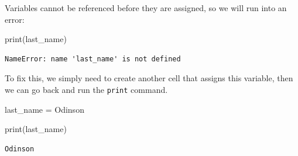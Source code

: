 \documentclass[
  letterpaper,
  DIV=11,
  numbers=noendperiod]{scrreprt}
\newenvironment{Shaded}{\begin{snugshade}}{\end{snugshade}}
\newcommand{\BuiltInTok}[1]{\textcolor[rgb]{0.00,0.23,0.31}{#1}}
\newcommand{\NormalTok}[1]{\textcolor[rgb]{0.00,0.23,0.31}{#1}}
\newcommand{\OperatorTok}[1]{\textcolor[rgb]{0.37,0.37,0.37}{#1}}
\newcommand{\StringTok}[1]{\textcolor[rgb]{0.13,0.47,0.30}{#1}}
\begin{document}
\begin{tcolorbox}[enhanced jigsaw, rightrule=.15mm, opacitybacktitle=0.6, colback=white, toprule=.15mm, colframe=quarto-callout-note-color-frame, bottomtitle=1mm, bottomrule=.15mm, arc=.35mm, coltitle=black, breakable, title={Solution to Challenge 1}, titlerule=0mm, opacityback=0, colbacktitle=quarto-callout-note-color!10!white, left=2mm, toptitle=1mm, leftrule=.75mm]

Variables cannot be referenced before they are assigned, so we will run
into an error:

\begin{Shaded}
\begin{Highlighting}[]
\BuiltInTok{print}\NormalTok{(last\_name)}
\end{Highlighting}
\end{Shaded}

\begin{verbatim}
NameError: name 'last_name' is not defined
\end{verbatim}

To fix this, we simply need to create another cell that assigns this
variable, then we can go back and run the \texttt{print} command.

\begin{Shaded}
\begin{Highlighting}[]
\NormalTok{last\_name }\OperatorTok{=} \StringTok{\textquotesingle{}Odinson\textquotesingle{}}
\end{Highlighting}
\end{Shaded}

\begin{Shaded}
\begin{Highlighting}[]
\BuiltInTok{print}\NormalTok{(last\_name)}
\end{Highlighting}
\end{Shaded}

\begin{verbatim}
Odinson
\end{verbatim}

\end{tcolorbox}
\end{document}
